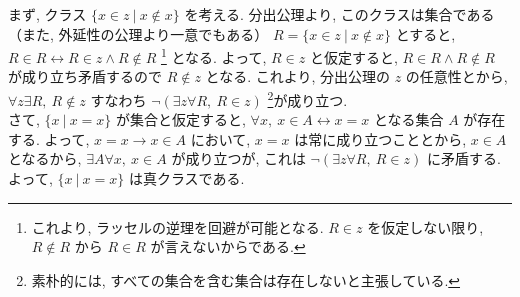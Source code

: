 \begin{nmprob}
{まず, クラス $\{x \in z\ |\ x \notin x\}$ を考える. 分出公理より, このクラスは集合である（また, 外延性の公理より一意でもある） $R = \{x \in z\ |\ x \notin x\}$ とすると,
$R \in R \leftrightarrow R \in z \land R \notin R$ \footnote[2]{これより, ラッセルの逆理を回避が可能となる. $R \in z$ を仮定しない限り, $R \notin R$ から $R \in R$ が言えないからである.}
となる. よって, $R \in z$ と仮定すると, $R \in R \land R \notin R$ が成り立ち矛盾するので $R \notin z$ となる.
これより, 分出公理の $z$ の任意性とから, $\forall z \exists R,\ R \notin z$ すなわち $\lnot (\exists z \forall R,\ R \in z)$ \footnote[3]{素朴的には, すべての集合を含む集合は存在しないと主張している.}が成り立つ.\\
さて, $\{ x\ |\ x = x\}$ が集合と仮定すると, $\forall x,\ x \in A \leftrightarrow x = x$ となる集合 $A$ が存在する.
よって, $x = x \to x \in A$ において, $x = x$ は常に成り立つこととから, $x \in A$ となるから, $\exists A\forall x,\ x \in A$ が成り立つが,
これは $\lnot (\exists z \forall R,\ R \in z)$ に矛盾する. よって, $\{ x\ |\ x = x\}$ は真クラスである.
}
\end{nmprob}



